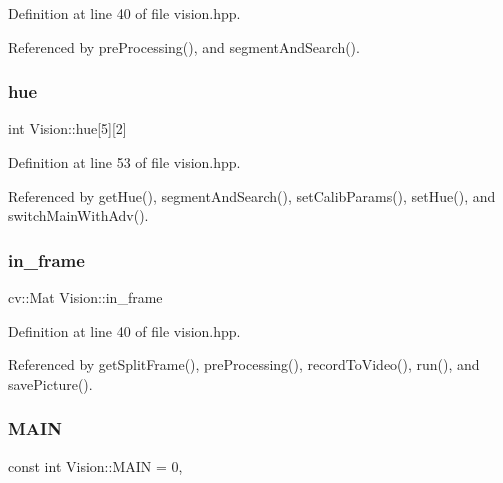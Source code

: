 Definition at line 40 of file vision.\+hpp.



Referenced by pre\+Processing(), and segment\+And\+Search().

\mbox{\label{class_vision_a557114ed93889df7c09fe7add7a2fa1f}} 
\subsubsection{\texorpdfstring{hue}{hue}}
{\footnotesize\ttfamily int Vision\+::hue\mbox{[}5\mbox{]}\mbox{[}2\mbox{]}\hspace{0.3cm}{\ttfamily [private]}}



Definition at line 53 of file vision.\+hpp.



Referenced by get\+Hue(), segment\+And\+Search(), set\+Calib\+Params(), set\+Hue(), and switch\+Main\+With\+Adv().

\mbox{\label{class_vision_a905e6a0333e4931dfd2e0e44b07b51c9}} 
\subsubsection{\texorpdfstring{in\+\_\+frame}{in\_frame}}
{\footnotesize\ttfamily cv\+::\+Mat Vision\+::in\+\_\+frame\hspace{0.3cm}{\ttfamily [private]}}



Definition at line 40 of file vision.\+hpp.



Referenced by get\+Split\+Frame(), pre\+Processing(), record\+To\+Video(), run(), and save\+Picture().

\mbox{\label{class_vision_ae7d1888ee66883aabbdfc7390d338367}} 
\subsubsection{\texorpdfstring{M\+A\+IN}{MAIN}}
{\footnotesize\ttfamily const int Vision\+::\+M\+A\+IN = 0\hspace{0.3cm}{\ttfamily [static]}, {\ttfamily [private]}}



